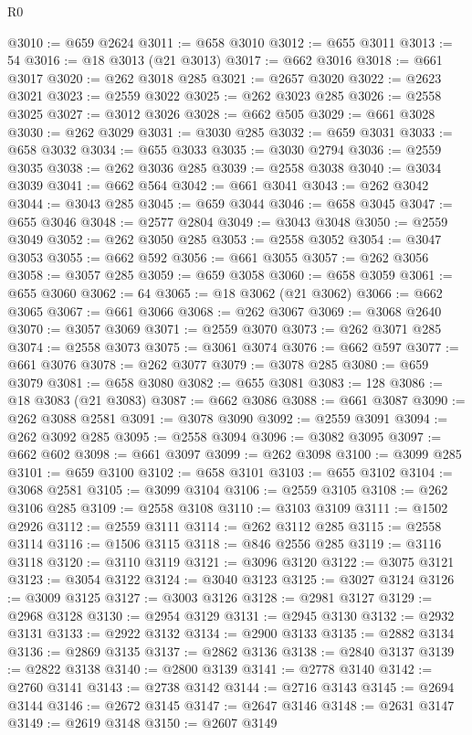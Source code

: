 \begin{lexlean}{R0}
\begin{coremodule}
@3010 := @659 @2624
@3011 := @658 @3010
@3012 := @655 @3011
@3013 := 54
@3016 := @18 @3013 (@21 @3013)
@3017 := @662 @3016
@3018 := @661 @3017
@3020 := @262 @3018 @285
@3021 := @2657 @3020
@3022 := @2623 @3021
@3023 := @2559 @3022
@3025 := @262 @3023 @285
@3026 := @2558 @3025
@3027 := @3012 @3026
@3028 := @662 @505
@3029 := @661 @3028
@3030 := @262 @3029
@3031 := @3030 @285
@3032 := @659 @3031
@3033 := @658 @3032
@3034 := @655 @3033
@3035 := @3030 @2794
@3036 := @2559 @3035
@3038 := @262 @3036 @285
@3039 := @2558 @3038
@3040 := @3034 @3039
@3041 := @662 @564
@3042 := @661 @3041
@3043 := @262 @3042
@3044 := @3043 @285
@3045 := @659 @3044
@3046 := @658 @3045
@3047 := @655 @3046
@3048 := @2577 @2804
@3049 := @3043 @3048
@3050 := @2559 @3049
@3052 := @262 @3050 @285
@3053 := @2558 @3052
@3054 := @3047 @3053
@3055 := @662 @592
@3056 := @661 @3055
@3057 := @262 @3056
@3058 := @3057 @285
@3059 := @659 @3058
@3060 := @658 @3059
@3061 := @655 @3060
@3062 := 64
@3065 := @18 @3062 (@21 @3062)
@3066 := @662 @3065
@3067 := @661 @3066
@3068 := @262 @3067
@3069 := @3068 @2640
@3070 := @3057 @3069
@3071 := @2559 @3070
@3073 := @262 @3071 @285
@3074 := @2558 @3073
@3075 := @3061 @3074
@3076 := @662 @597
@3077 := @661 @3076
@3078 := @262 @3077
@3079 := @3078 @285
@3080 := @659 @3079
@3081 := @658 @3080
@3082 := @655 @3081
@3083 := 128
@3086 := @18 @3083 (@21 @3083)
@3087 := @662 @3086
@3088 := @661 @3087
@3090 := @262 @3088 @2581
@3091 := @3078 @3090
@3092 := @2559 @3091
@3094 := @262 @3092 @285
@3095 := @2558 @3094
@3096 := @3082 @3095
@3097 := @662 @602
@3098 := @661 @3097
@3099 := @262 @3098
@3100 := @3099 @285
@3101 := @659 @3100
@3102 := @658 @3101
@3103 := @655 @3102
@3104 := @3068 @2581
@3105 := @3099 @3104
@3106 := @2559 @3105
@3108 := @262 @3106 @285
@3109 := @2558 @3108
@3110 := @3103 @3109
@3111 := @1502 @2926
@3112 := @2559 @3111
@3114 := @262 @3112 @285
@3115 := @2558 @3114
@3116 := @1506 @3115
@3118 := @846 @2556 @285
@3119 := @3116 @3118
@3120 := @3110 @3119
@3121 := @3096 @3120
@3122 := @3075 @3121
@3123 := @3054 @3122
@3124 := @3040 @3123
@3125 := @3027 @3124
@3126 := @3009 @3125
@3127 := @3003 @3126
@3128 := @2981 @3127
@3129 := @2968 @3128
@3130 := @2954 @3129
@3131 := @2945 @3130
@3132 := @2932 @3131
@3133 := @2922 @3132
@3134 := @2900 @3133
@3135 := @2882 @3134
@3136 := @2869 @3135
@3137 := @2862 @3136
@3138 := @2840 @3137
@3139 := @2822 @3138
@3140 := @2800 @3139
@3141 := @2778 @3140
@3142 := @2760 @3141
@3143 := @2738 @3142
@3144 := @2716 @3143
@3145 := @2694 @3144
@3146 := @2672 @3145
@3147 := @2647 @3146
@3148 := @2631 @3147
@3149 := @2619 @3148
@3150 := @2607 @3149

\end{coremodule}
\end{lexlean}
